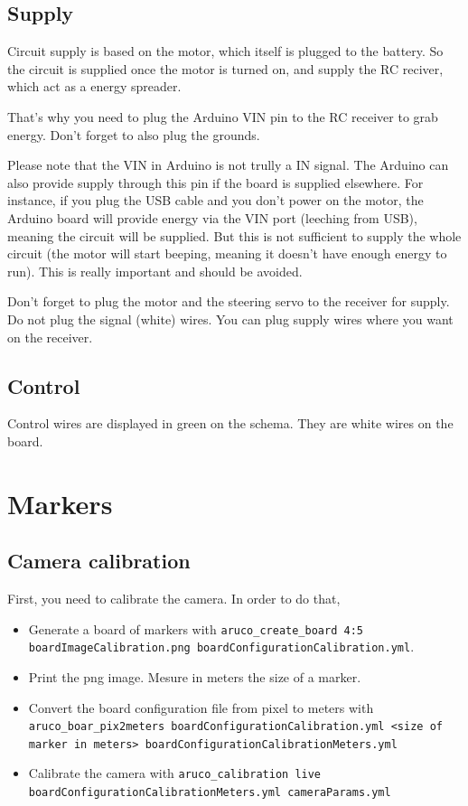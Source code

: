 \documentclass[a4paper,11pt]{report}
\begin{document}
\subsection{Supply}
Circuit supply is based on the motor, which itself is plugged to the
battery. So the circuit is supplied once the motor is turned on, and supply the
RC reciver, which act as a energy spreader.

That's why you need to plug the Arduino VIN pin to the RC receiver to grab
energy. Don't forget to also plug the grounds.

Please note that the VIN in Arduino is not trully a IN signal. The Arduino can
also provide supply through this pin if the board is supplied elsewhere. For
instance, if you plug the USB cable and you don't power on the motor, the
Arduino board will provide energy via the VIN port (leeching from USB), meaning
the circuit will be supplied. But this is not sufficient to supply the whole
circuit (the motor will start beeping, meaning it doesn't have enough energy to
run). This is really important and should be avoided.

Don't forget to plug the motor and the steering servo to the receiver for
supply. Do not plug the signal (white) wires. You can plug supply wires where
you want on the receiver.

\subsection{Control}

Control wires are displayed in green on the schema. They are white wires on the
board.

\section{Markers}

\subsection{Camera calibration}
\label{subsec:cam}

First, you need to calibrate the camera. In order to do that, \begin{itemize}

    \item Generate a board of markers with \texttt{aruco\_create\_board 4:5
        boardImageCalibration.png boardConfigurationCalibration.yml}.

    \item Print the png image. Mesure in meters the size of a marker.

    \item Convert the board configuration file from pixel to meters with
        \texttt{aruco\_boar\_pix2meters boardConfigurationCalibration.yml <size
        of marker in meters> boardConfigurationCalibrationMeters.yml}

    \item Calibrate the camera with \texttt{aruco\_calibration live
        boardConfigurationCalibrationMeters.yml cameraParams.yml}

\end{itemize}
\end{document}
